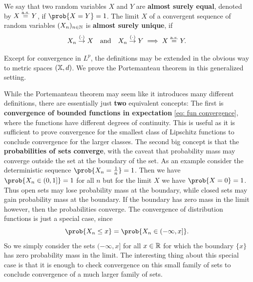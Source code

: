 \begin{mdframed}[innertopmargin=0pt]
\begin{definition}
\begin{itemize}
\begin{enumerate}[label={(DF)},nosep,leftmargin=3em]
\[            \]
        \end{enumerate}
    \end{itemize}
    We say that two random variables \(X\) and \(Y\) are \textbf{almost surely equal},
    denoted by \(X \overset{\operatorname{\text{a.s.}}}= Y\), if \(\prob{X = Y} = 1\).
    The limit \(X\) of a convergent sequence of random variables \((X_n)_{n\in \mathbb{N}}\) is \textbf{almost
    surely unique}, if
    \[
        X_n \overset{(\cdot)}\to X \quad \text{and} \quad X_n \overset{(\cdot)}\to Y \implies X \overset{\operatorname{\text{a.s.}}}= Y.
    \]
\end{definition}
\end{mdframed}

\begin{remark}
    Except for convergence in \(L^p\), the definitions may be extended in the
    obvious way to metric spaces \((\mathbb{X}, d)\). We
    prove the Portemanteau theorem in this generalized setting.
\end{remark}

While the Portemanteau theorem may seem like it introduces many different
definitions, there are essentially just \textbf{two} equivalent concepts:
The first is \textbf{convergence of bounded functions in expectation} \eqref{eq: fun
convergence}, where the functions have different degrees of continuity. 
This is useful as it is sufficient to prove convergence for the smallest
class of Lipschitz functions to conclude convergence for the larger classes.
The second big concept is that the \textbf{probabilities of sets converge},
with the caveat that probability mass may converge outside the set at the boundary
of the set. As an example consider the deterministic sequence \(\prob{X_n =
\frac1n} =1\). Then we have \(\prob{X_n \in (0,1]} =1\) for all \(n\) but for
the limit \(X\) we have \(\prob{X = 0} = 1\).
Thus open sets may lose probability mass at the boundary, while closed sets
may gain probability mass at the boundary. If the boundary has zero mass
in the limit however, then the probabilities converge.
The convergence of distribution functions is just a special case, since
\[
    \prob{X_n \le x} = \prob{X_n \in (-\infty, x]}.
\]
So we simply consider the sets \((-\infty, x]\) for all \(x\in \mathbb{R}\)
for which the boundary \(\{x\}\) has zero probability mass in the limit.
The interesting thing about this special case is that it is enough to check
convergence on this small family of sets to conclude convergence of
a much larger family of sets.

